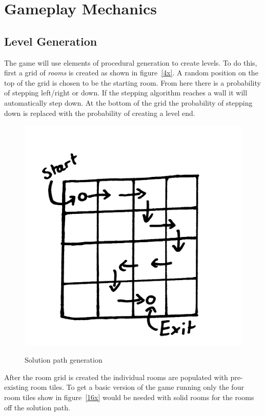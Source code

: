 
\section{Gameplay Mechanics}

\subsection{Level Generation}

The game will use elements of procedural generation to create levels. To do this, first a grid of \textit{rooms} is created as shown in figure~\ref{4x}. A random position on the top of the grid is chosen to be the starting room. From here there is a probability of stepping left/right or down. If the stepping algorithm reaches a wall it will automatically step down. At the bottom of the grid the probability of stepping down is replaced with the probability of creating a level end.

\begin{figure}[ht]
\centering
\includegraphics[scale=0.2, trim = 0cm 0cm 0cm 5cm]{images/4x4}
\label{fig:4x}
\caption{Solution path generation}
\end{figure}

After the room grid is created the individual rooms are populated with pre-existing room tiles. To get a basic version of the game running only the four room tiles show in figure~\ref{16x} would be needed with solid rooms for the rooms off the solution path.

